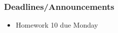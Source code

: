 
\begin{frame}
    \frametitle{Deadlines/Announcements}
    \begin{itemize}
        \item Homework 10 due Monday
    \end{itemize}
\end{frame}
